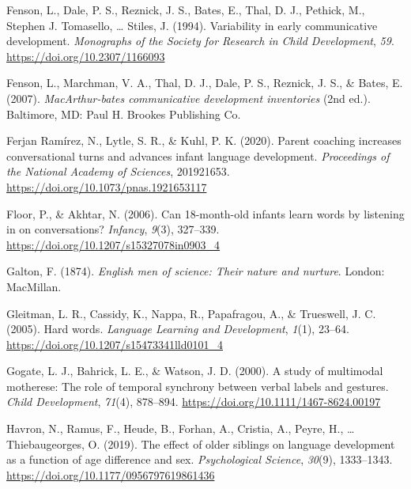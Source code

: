 \documentclass[
  english,
  man,floatsintext]{apa6}
\newlength{\cslhangindent}
\newlength{\cslentryspacingunit} %
\newenvironment{CSLReferences}[2] %
 {%
  \setlength{\parindent}{0pt}
  \ifodd #1
  \let\oldpar\par
  \def\par{\hangindent=\cslhangindent\oldpar}
  \fi
  \setlength{\parskip}{#2\cslentryspacingunit}
 }%
 {}
\begin{document}
\begin{CSLReferences}{1}{0}
\leavevmode{}%
Fenson, L., Dale, P. S., Reznick, J. S., Bates, E., Thal, D. J., Pethick, M., Stephen J. Tomasello, \ldots{} Stiles, J. (1994). Variability in early communicative development. \emph{Monographs of the Society for Research in Child Development}, \emph{59}. \url{https://doi.org/10.2307/1166093}

\leavevmode{}%
Fenson, L., Marchman, V. A., Thal, D. J., Dale, P. S., Reznick, J. S., \& Bates, E. (2007). \emph{{MacArthur}-bates communicative development inventories} (2nd ed.). Baltimore, {MD}: Paul H. Brookes Publishing Co.

\leavevmode{}%
Ferjan Ramírez, N., Lytle, S. R., \& Kuhl, P. K. (2020). Parent coaching increases conversational turns and advances infant language development. \emph{Proceedings of the National Academy of Sciences}, 201921653. \url{https://doi.org/10.1073/pnas.1921653117}

\leavevmode{}%
Floor, P., \& Akhtar, N. (2006). Can 18-month-old infants learn words by listening in on conversations? \emph{Infancy}, \emph{9}(3), 327--339. \url{https://doi.org/10.1207/s15327078in0903_4}

\leavevmode{}%
Galton, F. (1874). \emph{English men of science: Their nature and nurture}. London: {MacMillan}.

\leavevmode{}%
Gleitman, L. R., Cassidy, K., Nappa, R., Papafragou, A., \& Trueswell, J. C. (2005). Hard words. \emph{Language Learning and Development}, \emph{1}(1), 23--64. \url{https://doi.org/10.1207/s15473341lld0101_4}

\leavevmode{}%
Gogate, L. J., Bahrick, L. E., \& Watson, J. D. (2000). A study of multimodal motherese: The role of temporal synchrony between verbal labels and gestures. \emph{Child Development}, \emph{71}(4), 878--894. \url{https://doi.org/10.1111/1467-8624.00197}

\leavevmode{}%
Havron, N., Ramus, F., Heude, B., Forhan, A., Cristia, A., Peyre, H., \ldots{} Thiebaugeorges, O. (2019). The effect of older siblings on language development as a function of age difference and sex. \emph{Psychological Science}, \emph{30}(9), 1333--1343. \url{https://doi.org/10.1177/0956797619861436}


\end{CSLReferences}
\end{document}
